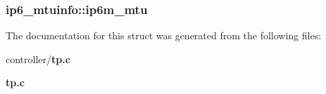 \subsubsection[{ip6m\_\-mtu}]{ {\bf ip6\_\-mtuinfo::ip6m\_\-mtu}}\label{structip6__mtuinfo_ac33e44b56c1766156f82d4f75e487dc7}


The documentation for this struct was generated from the following files:\begin{DoxyCompactItemize}
\item 
controller/{\bf tp.c}\item 
{\bf tp.c}\end{DoxyCompactItemize}

